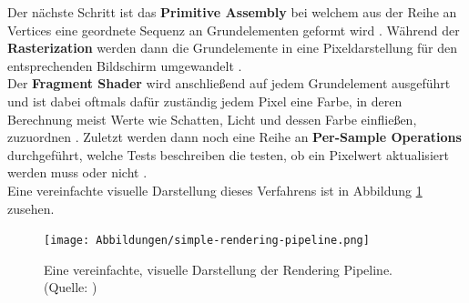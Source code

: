 Der nächste Schritt ist das \textbf{Primitive Assembly} bei welchem aus der Reihe an Vertices eine geordnete Sequenz an Grundelementen geformt wird \citep{khronos:rendering-pipeline}. 
Während der \textbf{Rasterization} werden dann die Grundelemente in eine Pixeldarstellung für den entsprechenden Bildschirm umgewandelt \citep{vries:learn-opengl-triangle}.\\
Der \textbf{Fragment Shader} wird anschließend auf jedem Grundelement ausgeführt und ist dabei oftmals dafür zuständig jedem Pixel eine Farbe, in deren Berechnung meist Werte wie Schatten, Licht und dessen Farbe einfließen, zuzuordnen \citep{vries:learn-opengl-triangle}.
Zuletzt werden dann noch eine Reihe an \textbf{Per-Sample Operations} durchgeführt, welche Tests beschreiben die testen, ob ein Pixelwert aktualisiert werden muss oder nicht \citep{khronos:rendering-pipeline}.\\
Eine vereinfachte visuelle Darstellung dieses Verfahrens ist in Abbildung \ref{fig:visual-pipeline} zusehen.
\begin{figure}[h!]
\centering
\texttt{[image: Abbildungen/simple-rendering-pipeline.png]}
\caption[Visuelle Darstellung der Rendering Pipline]{Eine vereinfachte, visuelle Darstellung der Rendering Pipeline. (Quelle: \citet{vries:learn-opengl-triangle})}
\label{fig:visual-pipeline}
\end{figure}





